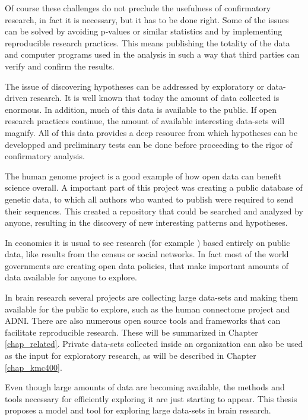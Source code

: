 Of course these challenges do not preclude the usefulness of confirmatory research, in fact it is necessary, but it has to be done right. Some of the issues can be solved by avoiding p-values or similar statistics and by implementing reproducible research practices. This means publishing the totality of the data and computer programs used in the analysis in such a way that third parties can verify and confirm the results. 

The issue of discovering hypotheses can be addressed by exploratory or data-driven research. It is well known that today the amount of data collected is enormous. In addition, much of this data is available to the public. If open research practices continue, the amount of available interesting data-sets will magnify. All of this data provides a deep resource from which hypotheses can be developped and preliminary tests can be done before proceeding to the rigor of confirmatory analysis. 

The human genome project \autocite{green_human_2015} is a good example of how open data can benefit science overall. A important part of this project was creating a public database of genetic data, to which all authors who wanted to publish were required to send their sequences. This created a repository that could be searched and analyzed by anyone, resulting in the discovery of new interesting patterns and hypotheses.

In economics it is usual to see research (for example \autocite{levitt_freakonomics_2006}) based entirely on public data, like results from the census or social networks. In fact most of the world governments are creating open data policies, that make important amounts of data available for anyone to explore.

In brain research several projects are collecting large data-sets and making them available for the public to explore, such as the human connectome project\autocite{rosen_human_2010} and ADNI\autocite{jack_alzheimers_2008}. There are also numerous open source tools and frameworks that can facilitate reproducible research. These will be summarized in Chapter \ref{chap_related}. Private data-sets collected inside an organization can also be used as the input for exploratory research, as will be described in Chapter \ref{chap_kmc400}.

Even though large amounts of data are becoming available, the methods and tools necessary for efficiently exploring it are just starting to appear. This thesis proposes a model and tool for exploring large data-sets in brain research. 

